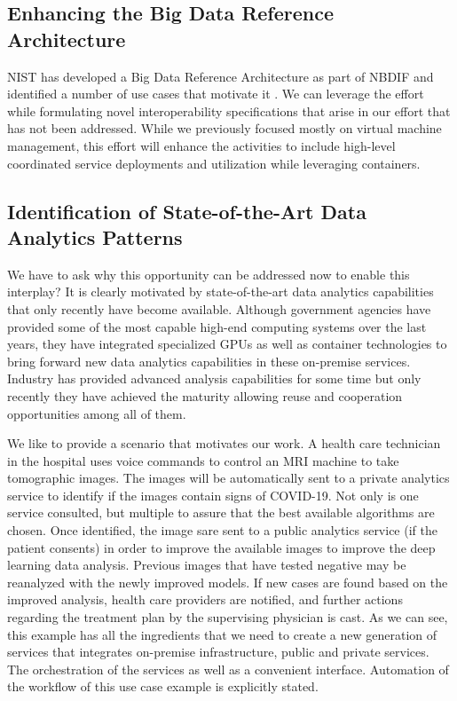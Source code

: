 \subsection{Enhancing the Big Data Reference Architecture}
\label{s:arch}

NIST has developed a Big Data Reference Architecture as part of
NBDIF\cite{nist-v6} and identified a number of use cases that motivate
it \cite{nist-v3}. We can leverage the effort
~\cite{nist-v1,nist-v2,nist-v3,nist-v4,nist-v5,nist-v6,nist-v7,nist-v8,nist-v9}
while formulating novel interoperability specifications that arise in
our effort that has not been addressed. While we previously focused
mostly on virtual machine management, this effort will enhance the
activities to include high-level coordinated service deployments and
utilization while leveraging containers.

\subsection{Identification of State-of-the-Art Data Analytics Patterns}

We have to ask why this opportunity can be addressed now to enable
this interplay?  It is clearly motivated by state-of-the-art data
analytics capabilities that only recently have become available.
Although government agencies have provided some of the most capable
high-end computing systems over the last years, they have integrated
specialized GPUs as well as container technologies to bring forward
new data analytics capabilities in these on-premise services. Industry
has provided advanced analysis capabilities for some time but only
recently they have achieved the maturity allowing reuse and
cooperation opportunities among all of them.

We like to provide a scenario that motivates our work. A health care
technician in the hospital uses voice commands to control an MRI
machine to take tomographic images. The images will be automatically
sent to a private analytics service to identify if the images contain
signs of COVID-19. Not only is one service consulted, but multiple to
assure that the best available algorithms are chosen. Once identified,
the image sare sent to a public analytics service (if the patient consents) in
order to improve the available images to improve the deep learning data
analysis. Previous images that have tested negative may be reanalyzed
with the newly improved models. If new cases are found based on
the improved analysis, health care providers are notified, and further
actions regarding the treatment plan by the supervising physician is
cast. As we can see, this example has all the ingredients that we need
to create a new generation of services that integrates on-premise
infrastructure, public and private services. The orchestration of the
services as well as a convenient interface. Automation of the workflow
of this use case example is explicitly stated.

